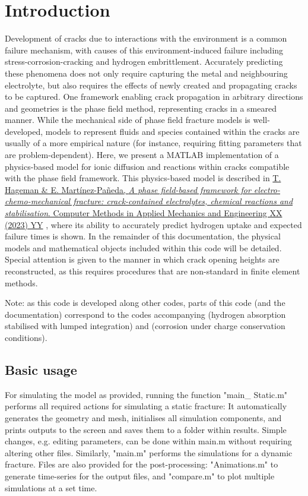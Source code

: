 \documentclass[3p]{elsarticle} %
\newcommand{\citeMe}{\href{http://doi.org/XXXX}{T. Hageman \& E. Martínez-Pañeda, \textit{A phase field-based framework for electro-chemo-mechanical fracture: crack-contained electrolytes, chemical reactions and stabilisation}. Computer Methods in Applied Mechanics and Engineering XX (2023) YY} \citep{Hageman2023}}
\begin{document}
\section{Introduction}
Development of cracks due to interactions with the environment is a common failure mechanism, with causes of this environment-induced failure including stress-corrosion-cracking and hydrogen embrittlement. Accurately predicting these phenomena does not only require capturing the metal and neighbouring electrolyte, but also requires the effects of newly created and propagating cracks to be captured. One framework enabling crack propagation in arbitrary directions and geometries is the phase field method, representing cracks in a smeared manner. While the mechanical side of phase field fracture models is well-developed, models to represent fluids and species contained within the cracks are usually of a more empirical nature (for instance, requiring fitting parameters that are problem-dependent). Here, we present a MATLAB implementation of a physics-based model for ionic diffusion and reactions within cracks compatible with the phase field framework. This physics-based model is described in \citeMe{}, where its ability to accurately predict hydrogen uptake and expected failure times is shown. In the remainder of this documentation, the physical models and mathematical objects included within this code will be detailed. Special attention is given to the manner in which crack opening heights are reconstructed, as this requires procedures that are non-standard in finite element methods.

Note: as this code is developed along other codes, parts of this code (and the documentation) correspond to the codes accompanying \citep{Hageman2023a} (hydrogen absorption stabilised with lumped integration) and \citep{Hageman2023b} (corrosion under charge conservation conditions).

\subsection{Basic usage}
For simulating the model as provided, running the function "main\_ Static.m" performs all required actions for simulating a static fracture: It automatically generates the geometry and mesh, initialises all simulation components, and prints outputs to the screen and saves them to a folder within results. Simple changes, e.g. editing parameters, can be done within main.m without requiring altering other files. Similarly, "main.m" performs the simulations for a dynamic fracture. Files are also provided for the post-processing: "Animations.m" to generate time-series for the output files, and "compare.m" to plot multiple simulations at a set time.
\end{document}
